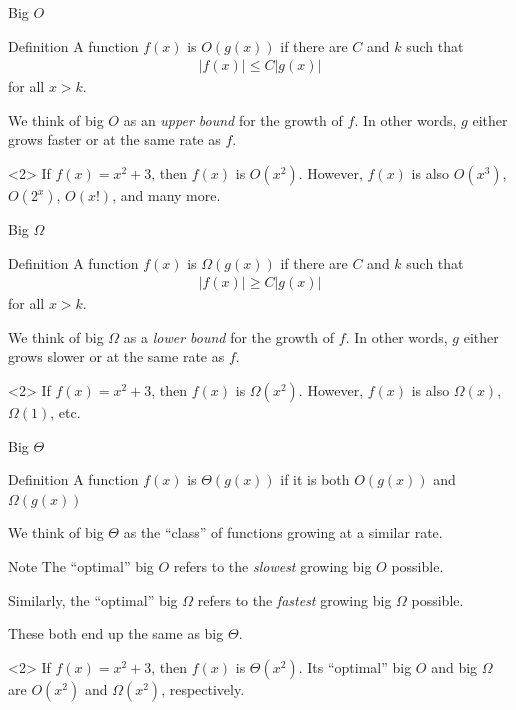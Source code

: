 \documentclass[dvipsnames,t]{beamer}
\begin{document}
\begin{frame}{Big $O$}
\begin{block}{Definition}
	A function $f(x)$ is $O(g(x))$ if there are $C$ and $k$ such that
	\begin{align*}
	|f(x)| \leq C|g(x)|
	\end{align*}
	for all $x>k$.
\end{block}
We think of big $O$ as an \textit{upper bound} for the growth of $f$. In other words, $g$ either grows faster or at the same rate as $f$.
\begin{example}<2>
If $f(x)=x^2+3$, then $f(x)$ is $O(x^2)$. However, $f(x)$ is also $O(x^3)$, $O(2^x)$, $O(x!)$, and many more.
\end{example}

\end{frame}

\begin{frame}{Big $\Omega$}
\begin{block}{Definition}
	A function $f(x)$ is $\Omega(g(x))$ if there are $C$ and $k$ such that
	\begin{align*}
	|f(x)| \geq C|g(x)|
	\end{align*}
	for all $x>k$.
\end{block}
We think of big $\Omega$ as a \textit{lower bound} for the growth of $f$. In other words, $g$ either grows slower or at the same rate as $f$.
\begin{example}<2>
If $f(x)=x^2+3$, then $f(x)$ is $\Omega(x^2)$. However, $f(x)$ is also $\Omega(x)$, $\Omega(1)$, etc.
\end{example}
\end{frame}

\begin{frame}{Big $\Theta$}
\begin{block}{Definition}
	A function $f(x)$ is $\Theta(g(x))$ if it is both $O(g(x))$ and $\Omega(g(x))$
\end{block}
We think of big $\Theta$ as the ``class'' of functions growing at a similar rate.
\begin{block}{Note}
The ``optimal'' big $O$ refers to the \textit{slowest} growing big $O$ possible. 

Similarly, the ``optimal'' big $\Omega$ refers to the \textit{fastest} growing big $\Omega$ possible. 

These both end up the same as big $\Theta$.
\end{block}
\begin{example}<2>
If $f(x)=x^2+3$, then $f(x)$ is $\Theta(x^2)$. Its ``optimal'' big $O$ and big $\Omega$ are $O(x^2)$ and $\Omega(x^2)$, respectively.
\end{example}
\end{frame}
\end{document}
